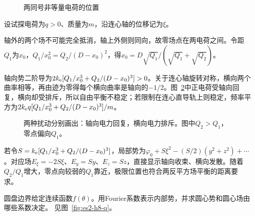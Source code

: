 \begin{figure}[H]\centering
{}
\caption{两同号非等量电荷的位置}\label{fig:es2-h7-q}
\end{figure}
\begin{solution}
设试探电荷为$q>0$、质量为$m$，沿连心轴的位移记为$\xi$。



轴外的两个场不可能完全抵消，轴上外侧则同向，故零场点在两电荷之间。令距$Q_1$为$x_0$，$Q_1/x_0^2=Q_2/(D-x_0)^2$，得$x_0=D\sqrt{Q_1}/(\sqrt{Q_1}+\sqrt{Q_2})$。

轴向势二阶导为$2k_{\rm e}[Q_1/x_0^3+Q_2/(D-x_0)^3]>0$。关于连心轴旋转对称，横向两个曲率相等，再由迹为零得每个横向曲率是轴向的$-1/2$。图~\ref{fig:es2-h7-s}中正电荷受轴向回复，横向却受排斥，所以自由平衡不稳定；若限制在连心直导轨上则稳定，频率平方为$2k_{\rm e} q[Q_1/x_0^3+Q_2/(D-x_0)^3]/m$。
\begin{figure}[H]\centering
{}
\caption{两种扰动分别画出：轴向电力回复，横向电力排斥。图中$Q_2>Q_1$，零点偏向$Q_1$。}\label{fig:es2-h7-s}
\end{figure}


若令$S=k_{\rm e}[Q_1/x_0^3+Q_2/(D-x_0)^3]$，局部势为$\varphi_0+S\xi^2-(S/2)(y^2+z^2)+\cdots$。对应场$E_\xi=-2S\xi$、$E_y=Sy$、$E_z=Sz$，直接显示轴向收束、横向发散。随着$Q_2/Q_1$增大，零点向较弱的$Q_1$靠近，极限位置也符合两反平方场平衡的距离要求。
\end{solution}

\begin{exercise}[圆盘内一般Fourier边界]\label{ex:es2-h8}
圆盘边界给定连续函数$f(\theta)$。用Fourier系数表示内部势，并求圆心势和圆心场由哪些系数决定。 见图~\ref{fig:es2-h8-q}。
\end{exercise}

